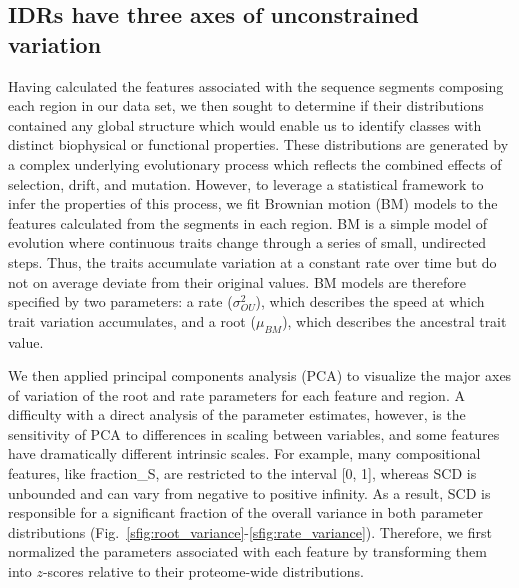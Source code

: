 \subsection{IDRs have three axes of unconstrained variation}
Having calculated the features associated with the sequence segments composing each region in our data set, we then sought to determine if their distributions contained any global structure which would enable us to identify classes with distinct biophysical or functional properties. These distributions are generated by a complex underlying evolutionary process which reflects the combined effects of selection, drift, and mutation. However, to leverage a statistical framework to infer the properties of this process, we fit Brownian motion (BM) models to the features calculated from the segments in each region. BM is a simple model of evolution where continuous traits change through a series of small, undirected steps. Thus, the traits accumulate variation at a constant rate over time but do not on average deviate from their original values. BM models are therefore specified by two parameters: a rate ($\sigma^2_{OU}$), which describes the speed at which trait variation accumulates, and a root ($\mu_{BM}$), which describes the ancestral trait value.

We then applied principal components analysis (PCA) to visualize the major axes of variation of the root and rate parameters for each feature and region. A difficulty with a direct analysis of the parameter estimates, however, is the sensitivity of PCA to differences in scaling between variables, and some features have dramatically different intrinsic scales. For example, many compositional features, like fraction\_S, are restricted to the interval [0, 1], whereas SCD is unbounded and can vary from negative to positive infinity. As a result, SCD is responsible for a significant fraction of the overall variance in both parameter distributions (Fig.~\ref{sfig:root_variance}-\ref{sfig:rate_variance}). Therefore, we first normalized the parameters associated with each feature by transforming them into $z$-scores relative to their proteome-wide distributions.

